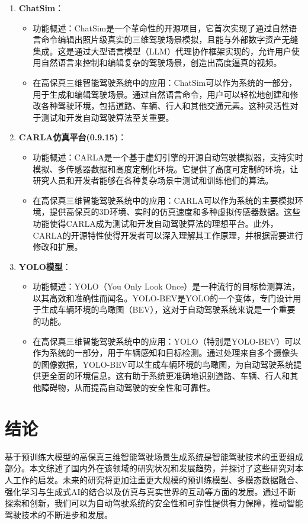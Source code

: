 \documentclass{article}
\begin{document}
\begin{enumerate}[label=\arabic*.]
    \item \textbf{ChatSim}：
        \begin{itemize}
            \item 功能概述：ChatSim是一个革命性的开源项目，它首次实现了通过自然语言命令编辑出照片级真实的三维驾驶场景模拟，且能与外部数字资产无缝集成。这是通过大型语言模型（LLM）代理协作框架实现的，允许用户使用自然语言来控制和编辑复杂的驾驶场景，创造出高度逼真的视频。
            \item 在高保真三维智能驾驶系统中的应用：ChatSim可以作为系统的一部分，用于生成和编辑驾驶场景。通过自然语言命令，用户可以轻松地创建和修改各种驾驶环境，包括道路、车辆、行人和其他交通元素。这种灵活性对于测试和开发自动驾驶算法至关重要。
        \end{itemize}
    \item \textbf{CARLA仿真平台(0.9.15)}：
        \begin{itemize}
            \item 功能概述：CARLA是一个基于虚幻引擎的开源自动驾驶模拟器，支持实时模拟、多传感器数据和高度定制化环境。它提供了高度可定制的环境，让研究人员和开发者能够在各种复杂场景中测试和训练他们的算法。
            \item 在高保真三维智能驾驶系统中的应用：CARLA可以作为系统的主要模拟环境，提供高保真的3D环境、实时的仿真速度和多种虚拟传感器数据。这些功能使得CARLA成为测试和开发自动驾驶算法的理想平台。此外，CARLA的开源特性使得开发者可以深入理解其工作原理，并根据需要进行修改和扩展。
        \end{itemize}
    \item \textbf{YOLO模型}：
        \begin{itemize}
            \item 功能概述：YOLO（You Only Look Once）是一种流行的目标检测算法，以其高效和准确性而闻名。YOLO-BEV是YOLO的一个变体，专门设计用于生成车辆环境的鸟瞰图（BEV），这对于自动驾驶系统来说是一个重要的功能。
            \item 在高保真三维智能驾驶系统中的应用：YOLO（特别是YOLO-BEV）可以作为系统的一部分，用于车辆感知和目标检测。通过处理来自多个摄像头的图像数据，YOLO-BEV可以生成车辆环境的鸟瞰图，为自动驾驶系统提供更全面的环境信息。这有助于系统更准确地识别道路、车辆、行人和其他障碍物，从而提高自动驾驶的安全性和可靠性。
        \end{itemize}
\end{enumerate}

\section{结论}
基于预训练大模型的高保真三维智能驾驶场景生成系统是智能驾驶技术的重要组成部分。本文综述了国内外在该领域的研究状况和发展趋势，并探讨了这些研究对本人工作的启发。未来的研究将更加注重更大规模的预训练模型、多模态数据融合、强化学习与生成式AI的结合以及仿真与真实世界的互动等方面的发展。通过不断探索和创新，我们可以为自动驾驶系统的安全性和可靠性提供有力保障，推动智能驾驶技术的不断进步和发展。
\end{document}
